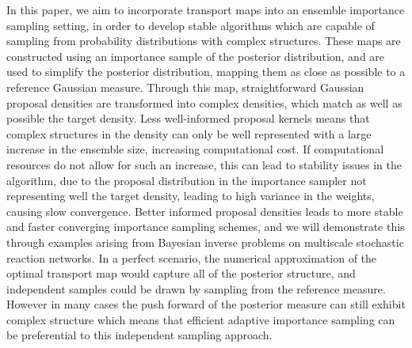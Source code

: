 \documentclass[final]{siamltex}
\newcommand{\edit}[1]{{\color{red} #1}}  %
\providecommand{\DIFaddbegin}{} %
\providecommand{\DIFaddend}{} %
\newcommand{\DIFaddincludegraphics}[2][]{{\color{blue}\fbox{\DIFOincludegraphics[#1]{#2}}}} %
\DeclareRobustCommand{\DIFaddbegin}{\DIFOaddbegin \let\includegraphics\DIFaddincludegraphics} %
\DeclareRobustCommand{\DIFaddend}{\DIFOaddend \let\includegraphics\DIFOincludegraphics} %
\begin{document}
\DIFaddbegin 





\DIFaddend In this paper, we aim to incorporate transport maps into an ensemble
importance sampling setting, in order to develop stable algorithms which are
capable of sampling from probability distributions with complex
structures. These maps are constructed using an importance sample of
the posterior distribution, and are used to simplify the posterior
distribution, mapping them as close as possible to a reference
Gaussian measure. Through this map, straightforward Gaussian proposal
densities are transformed into complex densities, which match as well
as possible the target density. Less well-informed proposal kernels means that complex
structures in the density can only be well represented with a large
increase in the ensemble size, increasing computational cost. If
computational resources do not allow for such an increase, this can
lead to stability issues in the algorithm, due to the proposal
distribution in the importance sampler not representing well the
target density, leading to high variance in the weights, causing slow
convergence. Better informed proposal densities
leads to more stable and faster converging importance sampling
schemes, and we will demonstrate this through examples
arising from Bayesian inverse problems on multiscale stochastic
reaction networks. \DIFaddbegin \edit{In a perfect scenario, the numerical
  approximation of the optimal transport map would capture all of the
  posterior structure, and independent samples could be drawn by
  sampling from the reference measure. However in many cases the push
  forward of the posterior measure can still exhibit complex structure
  which means that efficient adaptive importance sampling can be
  preferential to this independent sampling approach.}
\DIFaddend 
\end{document}
